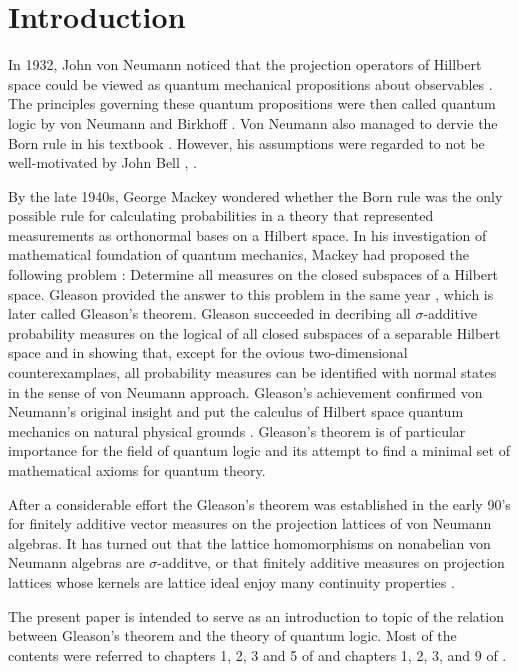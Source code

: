 \documentclass[a4paper,11pt]{report}
\theoremstyle{definition}
\theoremstyle{plain}
\theoremstyle{remark}
\begin{document}
\chapter*{Introduction}

In 1932, John von Neumann noticed that the projection operators of Hillbert space could be viewed as quantum mechanical propositions about observables \cite{Neumann2018}. The principles governing these quantum propositions were then called quantum logic by von Neumann and Birkhoff \cite{MR1503312}. Von Neumann also managed to dervie the Born rule in his textbook \cite{Neumann2018}. However, his assumptions were regarded to not be well-motivated by John Bell \cite{MR208927}, \cite{MR2726358}.

By the late 1940s, George Mackey wondered whether the Born rule was the only possible rule for calculating probabilities in a theory that represented measurements as orthonormal bases on a Hilbert space. In his investigation of mathematical foundation of quantum mechanics, Mackey had proposed the following problem \cite[p.50-51]{MR96112}\cite[p.129]{MR1256736}: Determine all measures on the closed subspaces of a Hilbert space. Gleason provided the answer to this problem in the same year \cite{MR96113}, which is later called Gleason's theorem. Gleason succeeded in decribing all \(\sigma\)-additive probability measures on the logical of all closed subspaces of a separable Hilbert space and in showing that, except for the ovious two-dimensional counterexamplaes, all probability measures can be identified with normal states in the sense of von Neumann approach. Gleason's achievement confirmed von Neumann's original insight and put the calculus of Hilbert space quantum mechanics on natural physical grounds \cite[p.87-88]{MR2015280}. Gleason's theorem is of particular importance for the field of quantum logic and its attempt to find a minimal set of mathematical axioms for quantum theory.

After a considerable effort the Gleason's theorem was established in the early 90's for finitely additive vector measures on the projection lattices of von Neumann algebras. It has turned out that the lattice homomorphisms on nonabelian von Neumann algebras are \(\sigma\)-additve, or that finitely additive measures on projection lattices whose kernels are lattice ideal enjoy many continuity properties \cite[p.3-4]{MR2015280}.

The present paper is intended to serve as an introduction to topic of the relation between Gleason's theorem and the theory of quantum logic. Most of the contents were referred to chapters 1, 2, 3 and 5 of \cite{MR1256736} and chapters 1, 2, 3, and 9 of \cite{MR2015280}.






\end{document}
